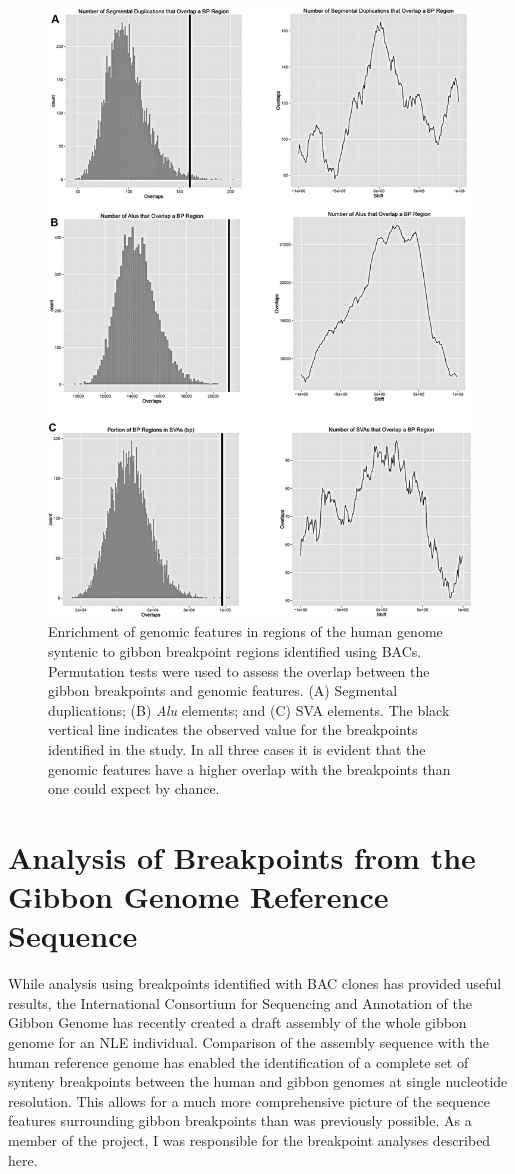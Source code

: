 \begin{figure}
\centering
\includegraphics[width=.85\textwidth]{figures/gibbon_bac_permutations.jpg}
\caption{Enrichment of genomic features in regions of the human genome syntenic to gibbon breakpoint regions identified using BACs. Permutation tests were used to assess the overlap between the gibbon breakpoints and genomic features. (A) Segmental duplications; (B) \emph{Alu} elements; and (C) SVA elements. The black vertical line indicates the observed value for the breakpoints identified in the study. In all three cases it is evident that the genomic features have a higher overlap with the breakpoints than one could expect by chance.}
\label{gibbon_bac_permutations}
\end{figure}

\section{Analysis of Breakpoints from the Gibbon Genome Reference Sequence}

While analysis using breakpoints identified with BAC clones has provided useful results, the International Consortium for Sequencing and Annotation of the Gibbon Genome has recently created a draft assembly of the whole gibbon genome for an NLE individual. Comparison of the assembly sequence with the human reference genome has enabled the identification of a complete set of synteny breakpoints between the human and gibbon genomes at single nucleotide resolution. This allows for a much more comprehensive picture of the sequence features surrounding gibbon breakpoints than was previously possible. As a member of the project, I was responsible for the breakpoint analyses described here.

